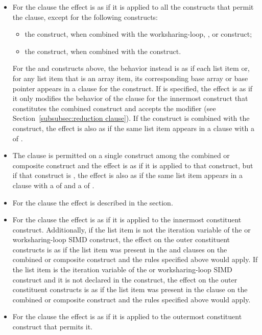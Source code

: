 \begin{itemize}
\item For the  clause the effect is as if it is applied to all the constructs that permit
the clause, except for the following constructs:
\begin{itemize}
\item the  construct, when combined with the
    worksharing-loop, , or  construct;
\item the  construct,  when combined with the  construct.
\end{itemize}
For the  and  constructs above, the behavior
instead is as if each list item or, for any list item that is an array item, its corresponding
base array or base pointer appears in a  clause for the construct.
If  is specified, the effect is as if it only modifies
the behavior of the  clause for the innermost construct that
constitutes the combined construct and accepts the modifier (see
Section~\ref{subsubsec:reduction clause}). If the construct is combined with
the  construct, the effect is also as if the same list item
appears in a  clause with a  of .

\item The  clause is permitted on a single construct
among the combined or composite construct and the effect is as if it is
applied to that construct, but if that construct is , the
effect is also as if the same list item appears in a  clause with
a  of  and a  of
.

\item For the  clause the effect is described in the  section.

\item For the  clause the effect is as if it is applied to the innermost
constituent construct.
Additionally, if the list item is not the iteration variable of the
 or worksharing-loop SIMD
construct, the effect on the outer constituent constructs is as if the list item was present
in the  and  clauses on the combined or
composite construct and the rules specified above would apply.  If the list item is the
iteration variable of the  or worksharing-loop SIMD construct and it is not declared in the construct,
the effect on the outer constituent constructs is as if the list item was present in the
 clause on the combined or composite construct and the rules specified above
would apply.

\item For the  clause the effect is as if it is applied to the
outermost constituent construct that permits it.

\end{itemize}

